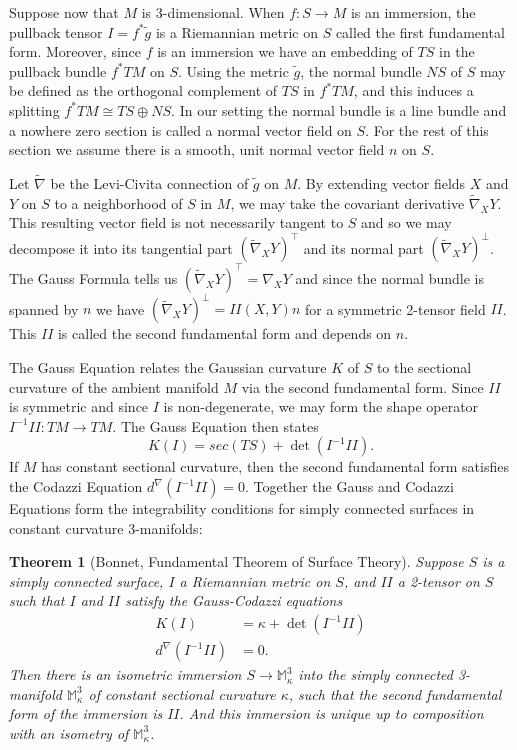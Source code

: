 \documentclass{amsart}
\newtheorem{thm}{Theorem}[section]
\newcommand{\two}{I\!\!I}
\begin{document}
Suppose now that $M$ is 3-dimensional. 
When $f: S \to M$ is an immersion, the pullback tensor $I = f^*\tilde{g}$ is a Riemannian metric on $S$ called the first fundamental form. 
Moreover, since $f$ is an immersion we have an embedding of $TS$ in the pullback bundle $f^*TM$ on $S$.
Using the metric $\tilde{g}$, the normal bundle $NS$ of $S$ may be defined as the orthogonal complement of $TS$ in $f^*TM$, and this induces a splitting $f^*TM \cong TS \oplus NS$. 
In our setting the normal bundle is a line bundle and a nowhere zero section is called a normal vector field on $S$. 
For the rest of this section we assume there is a smooth, unit normal vector field $n$ on $S$. 




Let $\widetilde{\nabla}$ be the Levi-Civita connection of $\tilde{g}$ on $M$.
By extending vector fields $X$ and $Y$ on $S$ to a neighborhood of $S$ in $M$, we may take the covariant derivative $\widetilde{\nabla}_X Y$.
This resulting vector field is not necessarily tangent to $S$ and so we may decompose it into its tangential part $(\widetilde{\nabla}_X Y)^\top$ and its normal part $(\widetilde{\nabla}_X Y)^\perp$.
The Gauss Formula tells us $(\widetilde{\nabla}_X Y)^\top = \nabla_X Y$ and since the normal bundle is spanned by $n$ we have $(\widetilde{\nabla}_X Y)^\perp = \two(X,Y)n$ for a symmetric 2-tensor field $\two$.
This $\two$ is called the second fundamental form and depends on $n$.

 
The Gauss Equation relates the Gaussian curvature $K$ of $S$ to the sectional curvature of the ambient manifold $M$ via the second fundamental form.
Since $\two$ is symmetric and since $I$ is non-degenerate, we may form the shape operator $I^{-1}\two: TM \to TM$.
The Gauss Equation then states
\[
K(I) = sec(TS) + \det(I^{-1}\two).
\]
If $M$ has constant sectional curvature, then the second fundamental form satisfies the Codazzi Equation $d^\nabla (I^{-1} \two) = 0$. 
Together the Gauss and Codazzi Equations form the integrability conditions for simply connected surfaces in constant curvature 3-manifolds:


\begin{thm}[Bonnet, Fundamental Theorem of Surface Theory]
Suppose $S$ is a simply connected surface, $I$ a Riemannian metric on $S$, and $\two$ a 2-tensor on $S$ such that $I$ and $\two$ satisfy the Gauss-Codazzi equations
\begin{align*}
K(I) &= \kappa + \det(I^{-1}\two) \\
d^\nabla (I^{-1}\two) &= 0.
\end{align*}
Then there is an isometric immersion $S \to \mathbb{M}_\kappa^3$ into the simply connected 3-manifold $\mathbb{M}^3_{\kappa}$ of constant sectional curvature $\kappa$, such that the second fundamental form of the immersion is $\two$. And this immersion is unique up to composition with an isometry of $\mathbb{M}_\kappa^3$.
\end{thm}
\end{document}
